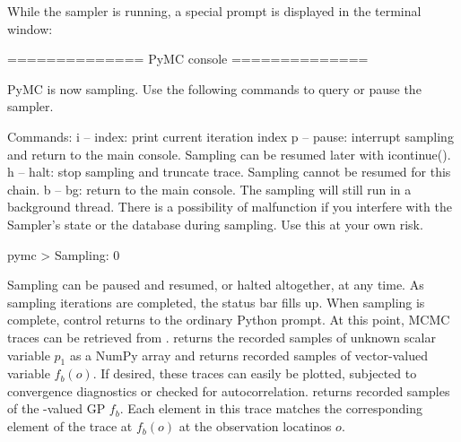 \documentclass[article]{jss}
\begin{document}
While the sampler is running, a special prompt is displayed in the terminal window:
\begin{tiny}
    \begin{CodeInput}
        ==============
         PyMC console
        ==============

                PyMC is now sampling. Use the following commands to query or pause the sampler.


                Commands:
                  i -- index: print current iteration index
                  p -- pause: interrupt sampling and return to the main console.
                              Sampling can be resumed later with icontinue().
                  h -- halt:  stop sampling and truncate trace. Sampling cannot be
                              resumed for this chain.
                  b -- bg:    return to the main console. The sampling will still
                              run in a background thread. There is a possibility of
                              malfunction if you interfere with the Sampler's
                              state or the database during sampling. Use this at your
                              own risk.

        pymc > Sampling:   0%
    \end{CodeInput}    
\end{tiny}
Sampling can be paused and resumed, or halted altogether, at any time. As sampling iterations are completed, the status bar fills up. When sampling is complete, control returns to the ordinary Python prompt. At this point, MCMC traces can be retrieved from .  returns the recorded samples of unknown scalar variable $p_1$ as a NumPy array and  returns recorded samples of vector-valued variable $f_b(o)$. If desired, these traces can easily be plotted, subjected to convergence diagnostics or checked for autocorrelation.  returns recorded samples of the -valued GP $f_b$. Each element in this trace matches the corresponding element of the trace at $f_b(o)$ at the observation locatinos $o$.
\end{document}

